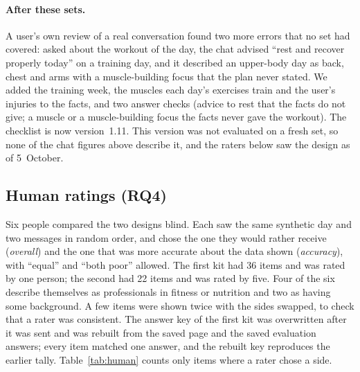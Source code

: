 \documentclass[10pt,twocolumn]{article}
\begin{document}
\paragraph{After these sets.} A user's own review of a real conversation found two more errors that no set had
covered: asked about the workout of the day, the chat advised ``rest and recover properly today'' on a training day, and
it described an upper-body day as back, chest and arms with a muscle-building focus that the plan never stated. We
added the training week, the muscles each day's exercises train and the user's injuries to the facts, and two answer checks
(advice to rest that the facts do not give; a muscle or a muscle-building focus the facts never gave the workout).
The checklist is now version~1.11. This version was not evaluated on a fresh set, so none of the chat figures above
describe it, and the raters below saw the design as of 5~October.

\subsection{Human ratings (RQ4)}
\label{sec:res-human}

Six people compared the two designs blind. Each saw the same synthetic day and two messages in random order, and
chose the one they would rather receive (\emph{overall}) and the one that was more accurate about the data shown
(\emph{accuracy}), with ``equal'' and ``both poor'' allowed. The first kit had 36 items and was rated by one person;
the second had 22 items and was rated by five. Four of the six describe themselves as professionals in fitness or
nutrition and two as having some background. A few items were shown twice with the sides swapped, to check that a rater
was consistent. The answer key of the first kit was overwritten after it was sent and was rebuilt from the saved page
and the saved evaluation answers; every item matched one answer, and the rebuilt key reproduces the earlier tally.
Table~\ref{tab:human} counts only items where a rater chose a side.
\end{document}
